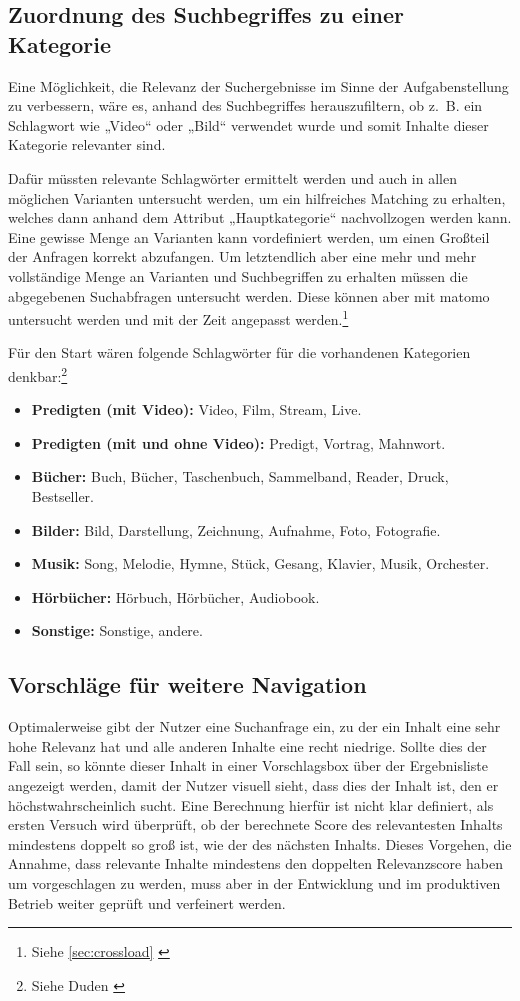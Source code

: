 \subsection{Zuordnung des Suchbegriffes zu einer Kategorie}
\label{sub:keyword}
Eine Möglichkeit, die Relevanz der Suchergebnisse im Sinne der Aufgabenstellung zu verbessern, wäre es, anhand des Suchbegriffes herauszufiltern, ob z. B. ein Schlagwort wie „Video“ oder „Bild“ verwendet wurde und somit Inhalte dieser Kategorie relevanter sind.

Dafür müssten relevante Schlagwörter ermittelt werden und auch in allen möglichen Varianten untersucht werden, um ein hilfreiches Matching zu erhalten, welches dann anhand dem Attribut „Hauptkategorie“ nachvollzogen werden kann.
Eine gewisse Menge an Varianten kann vordefiniert werden, um einen Großteil der Anfragen korrekt abzufangen.
Um letztendlich aber eine mehr und mehr vollständige Menge an Varianten und Suchbegriffen zu erhalten müssen die abgegebenen Suchabfragen untersucht werden.
Diese können aber mit \gls{matomo} untersucht werden und mit der Zeit angepasst werden.\footnote{Siehe \ref{sec:crossload} \cite{matomo2022}}

Für den Start wären folgende Schlagwörter für die vorhandenen Kategorien denkbar:\footnote{Siehe Duden \cite{dudensynonyme2022}}
\begin{itemize}
  \item \textbf{Predigten (mit Video):} Video, Film, Stream, Live.
  \item \textbf{Predigten (mit und ohne Video):} Predigt, Vortrag, Mahnwort.
  \item \textbf{Bücher:} Buch, Bücher, Taschenbuch, Sammelband, Reader, Druck, Bestseller.
  \item \textbf{Bilder:} Bild, Darstellung, Zeichnung, Aufnahme, Foto, Fotografie.
  \item \textbf{Musik:} Song, Melodie, Hymne, Stück, Gesang, Klavier, Musik, Orchester.
  \item \textbf{Hörbücher:} Hörbuch, Hörbücher, Audiobook.
  \item \textbf{Sonstige:} Sonstige, andere.
\end{itemize}

\subsection{Vorschläge für weitere Navigation}
\label{sub:suggestion}
Optimalerweise gibt der Nutzer eine Suchanfrage ein, zu der ein Inhalt eine sehr hohe Relevanz hat und alle anderen Inhalte eine recht niedrige.
Sollte dies der Fall sein, so könnte dieser Inhalt in einer Vorschlagsbox über der Ergebnisliste angezeigt werden, damit der Nutzer visuell sieht, dass dies der Inhalt ist, den er höchstwahrscheinlich sucht.
Eine Berechnung hierfür ist nicht klar definiert, als ersten Versuch wird überprüft, ob der berechnete Score des relevantesten Inhalts mindestens doppelt so groß ist, wie der des nächsten Inhalts.
Dieses Vorgehen, die Annahme, dass relevante Inhalte mindestens den doppelten Relevanzscore haben um vorgeschlagen zu werden, muss aber in der Entwicklung und im produktiven Betrieb weiter geprüft und verfeinert werden.

